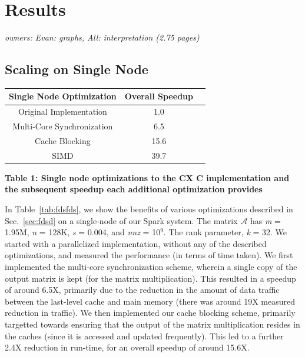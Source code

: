 \section{Results}
\label{sec:results}


\textit{owners: Evan: graphs, All: interpretation (2.75 pages)}

\subsection{Scaling on Single Node}

  \begin{center}
  \begin{tabular}{ |c|c|c| } 
  \hline
  Single Node Optimization & Overall Speedup\\
  \hline
  Original Implementation & 1.0  \\
  Multi-Core Synchronization & 6.5 \\
  Cache Blocking & 15.6 \\
  SIMD & 39.7 \\
  \hline

  \end{tabular}
  \end{center}
  \textbf{Table 1: Single node optimizations to the CX C implementation and the subsequent speedup each additional optimization provides}

  In Table~\ref{tab:fdsfds}, we show the benefits of various
  optimizations described in Sec.~\ref{sec:fdsd} on a single-node of our Spark system. 
  The matrix $\mathcal{A}$ has {\it{m}} = 1.95M, {\it{n}} = 128K,
  {\it{s}} = 0.004, and {\it{nnz}} = 10$^9$. The rank parameter,
  {\it{k}} = 32. We started with a parallelized implementation,
  without any of the described optimizations, and measured the 
  performance (in terms of time taken). We first implemented the 
  multi-core synchronization scheme, wherein a single copy of the 
  output matrix is kept (for the matrix multiplication).
  This resulted in a speedup of around 6.5X, primarily due to
  the reduction in the amount of data traffic between the 
  last-level cache and main memory (there was around 19X measured reduction
  in traffic). We then implemented our cache blocking scheme,
  primarily targetted towards ensuring that the output of the 
  matrix multiplication resides in the caches (since it is
  accessed and updated frequently). This led to a further 2.4X
 reduction in run-time, for an overall speedup of around 15.6X.

